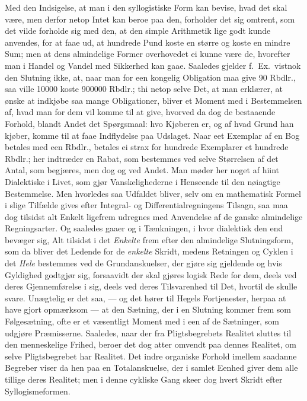 \documentclass[12pt,a4paper]{book}
\newcommand{\apage}[1]{\marginnote{\footnotesize\textit{[#1]}}}
\begin{document}
Med den Indsigelse, at man i den syllogistiske Form kan bevise, hvad det
skal være, men derfor netop Intet kan beroe paa den, forholder det sig
omtrent, som det vilde forholde sig med den, at den simple Arithmetik lige
godt kunde anvendes, for at faae ud, at hundrede Pund koste en større og
koste en mindre Sum; men at dens almindelige Former overhovedet ei kunne
være de, hvorefter man i Handel og Vandel med Sikkerhed kan gaae. Saaledes
gjelder f.\ Ex.\ vistnok den Slutning ikke, at, naar man for een kongelig
Obligation maa give 90 Rbdlr., saa ville 10000 koste 900000 Rbdlr.; thi
netop selve Det, at man erklærer, at ønske at indkjøbe saa mange
Obligationer, bliver et Moment med i Bestemmelsen af, hvad man for dem vil
komme til at give, hvorved da dog de bestaaende Forhold, blandt Andet det
Spørgsmaal: hvo Kjøberen er, og af hvad Grund han kjøber, komme til at faae
Indflydelse paa Udslaget. Naar eet Exemplar af en Bog betales med een
Rbdlr., betales ei strax for hundrede Exemplarer et hundrede Rbdlr.; her
indtræder en Rabat, som bestemmes ved selve Størrelsen af det Antal, som
begjæres, men dog og ved Andet. Man møder her noget af hiint Dialektiske i
Livet, \apage{91} som gjør Vanskelighederne i Henseende til den nøiagtige Bestemmelse.
Men hvorledes saa Udfaldet bliver, selv om en mathematisk Formel i slige
Tilfælde gives efter Integral- og Differentialregningens Tilsagn, saa maa
dog tilsidst alt Enkelt ligefrem udregnes med Anvendelse af de ganske
almindelige Regningsarter. Og saaledes gaaer og i Tænkningen, i hvor
dialektisk den end bevæger sig, Alt tilsidst i det \emph{Enkelte} frem efter den
almindelige Slutningsform, som da bliver det Ledende for de \emph{enkelte} Skridt,
medens Retningen og Cyklen i det \emph{Hele} bestemmes ved de Grundanskuelser, der
gjøre sig gjeldende og hvis Gyldighed godtgjør sig, forsaavidt der skal
gjøres logisk Rede for dem, deels ved deres Gjennemførelse i sig, deels ved
deres Tilsvarenhed til Det, hvortil de skulle svare. Unægtelig er det saa,
--- og det hører til Hegels Fortjenester, herpaa at have gjort opmærksom
--- at den Sætning, der i en Slutning kommer frem som Følgesætning, ofte er
et væsentligt Moment med i een af de Sætninger, som udgjøre Præmisserne.
Saaledes, naar der fra Pligtsbegrebets Realitet sluttes til den
menneskelige Frihed, beroer det dog atter omvendt paa dennes Realitet, om
selve Pligtsbegrebet har Realitet. Det indre organiske Forhold imellem
saadanne Begreber viser da hen paa en Totalanskuelse, der i samlet Eenhed
giver dem alle tillige deres Realitet; men i denne cykliske Gang skeer dog
hvert Skridt efter Syllogismeformen.
\end{document}
